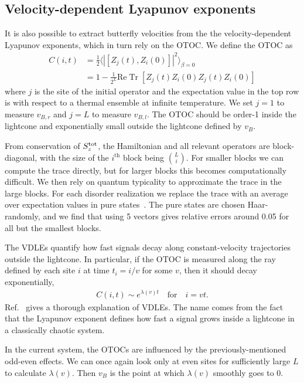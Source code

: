 \documentclass[aps,prx,reprint,superscriptaddress, longbibliography]{revtex4-1}
\newcommand{\Tr}{ \mbox{Tr}}
\renewcommand{\Re}{ \mbox{Re}}
\newcommand{\Sz}{S_z^{\rm tot}}
\newcommand{\half}{\frac{1}{2}}
\begin{document}
\subsection{Velocity-dependent Lyapunov exponents}

It is also possible to extract butterfly velocities from the the velocity-dependent Lyapunov exponents, which in turn rely on the OTOC. We define the OTOC as 
\begin{align}
C(i,t) & = \half \langle|[Z_j(t),Z_i(0)]|^2\rangle_{\beta=0}\nonumber\\
&= 1 - \frac{1}{2^{L}}\Re\;\Tr\;[Z_j(t)Z_i(0)Z_j(t)Z_i(0)]
\end{align}
where $j$ is the site of the initial operator and the expectation value in the top row is with respect to a thermal ensemble at infinite temperature. We set $j=1$ to measure $v_{B,r}$ and $j=L$ to measure $v_{B,l}$. The OTOC should be order-1 inside the lightcone and exponentially small outside the lightcone defined by $v_B$.

From conservation of $\Sz$, the Hamiltonian and all relevant operators are block-diagonal, with the size of the $i^\text{th}$ block being $\binom{L}{i}$. For smaller blocks we can compute the trace directly, but for larger blocks this becomes computationally difficult. We then rely on quantum typicality to approximate the trace in the large blocks. For each disorder realization we replace the trace with an average over expectation values in pure states~\cite{Luitz2017}. The pure states are chosen Haar-randomly, and we find that using 5 vectors gives relative errors around 0.05 for all but the smallest blocks.

The VDLEs quantify how fast signals decay along constant-velocity trajectories outside the lightcone. In particular, if the OTOC is measured along the ray defined by each site $i$ at time $t_i = i/v$ for some $v$, then it should decay exponentially,
\begin{align}
	C(i, t) \sim e^{\lambda(v)t}\quad\text{for}\quad i = vt.
\end{align}
Ref.~\cite{khemani2018lambda} gives a thorough explanation of VDLEs. The name comes from the fact that the Lyapunov exponent defines how fast a signal grows inside a lightcone in a classically chaotic system.

In the current system, the OTOCs are influenced by the previously-mentioned odd-even effects. We can once again look only at even sites for sufficiently large $L$ to calculate $\lambda(v)$. Then $v_B$ is the point at which $\lambda(v)$ smoothly goes to 0.
\end{document}
